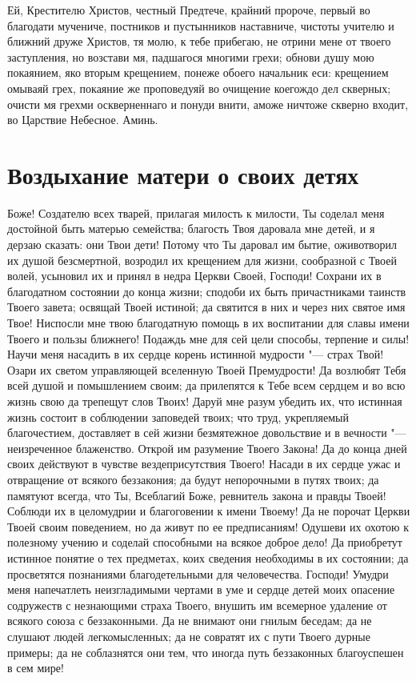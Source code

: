 Ей, Крестителю Христов, честный Предтече, крайний пророче, первый во благодати мучениче, постников и пустынников наставниче, чистоты учителю и ближний друже Христов, тя молю, к тебе прибегаю, не отрини мене от твоего заступления, но возстави мя, падшагося многими грехи; обнови душу мою покаянием, яко вторым крещением, понеже обоего начальник еси: крещением омываяй грех, покаяние же проповедуяй во очищение коегождо дел скверных; очисти мя грехми оскверненнаго и понуди внити, аможе ничтоже скверно входит, во Царствие Небесное. Аминь.

\section{Воздыхание матери о своих детях}
 


Боже! Создателю всех тварей, прилагая милость к милости, Ты соделал меня достойной быть матерью семейства; благость Твоя даровала мне детей, и я дерзаю сказать: они Твои дети! Потому что Ты даровал им бытие, оживотворил их душой безсмертной, возродил их крещением для жизни, сообразной с Твоей волей, усыновил их и принял в недра Церкви Своей, Господи! Сохрани их в благодатном состоянии до конца жизни; сподоби их быть причастниками таинств Твоего завета; освящай Твоей истиной; да святится в них и через них святое имя Твое! Ниспосли мне твою благодатную помощь в их воспитании для славы имени Твоего и пользы ближнего! Подаждь мне для сей цели способы, терпение и силы! Научи меня насадить в их сердце корень истинной мудрости "--- страх Твой! Озари их светом управляющей вселенную Твоей Премудрости! Да возлюбят Тебя всей душой и помышлением своим; да прилепятся к Тебе всем сердцем и во всю жизнь свою да трепещут слов Твоих! Даруй мне разум убедить их, что истинная жизнь состоит в соблюдении заповедей твоих; что труд, укрепляемый благочестием, доставляет в сей жизни безмятежное довольствие и в вечности "--- неизреченное блаженство. Открой им разумение Твоего Закона! Да до конца дней своих действуют в чувстве вездеприсутствия Твоего! Насади в их сердце ужас и отвращение от всякого беззакония; да будут непорочными в путях твоих; да памятуют всегда, что Ты, Всеблагий Боже, ревнитель закона и правды Твоей! Соблюди их в целомудрии и благоговении к имени Твоему! Да не порочат Церкви Твоей своим поведением, но да живут по ее предписаниям! Одушеви их охотою к полезному учению и соделай способными на всякое доброе дело! Да приобретут истинное понятие о тех предметах, коих сведения необходимы в их состоянии; да просветятся познаниями благодетельными для человечества. Господи! Умудри меня напечатлеть неизгладимыми чертами в уме и сердце детей моих опасение содружеств с незнающими страха Твоего, внушить им всемерное удаление от всякого союза с беззаконными. Да не внимают они гнилым беседам; да не слушают людей легкомысленных; да не совратят их с пути Твоего дурные примеры; да не соблазнятся они тем, что иногда путь беззаконных благоуспешен в сем мире!

